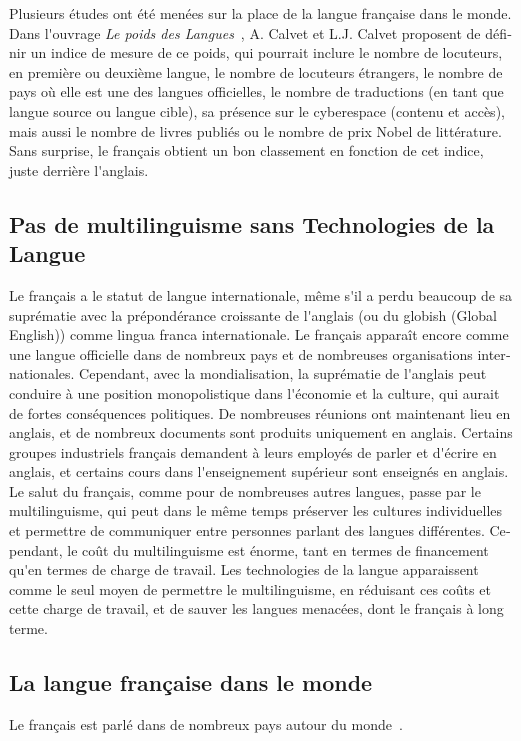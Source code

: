 \documentclass[]{../metanetpaper}
\begin{document}
\begin{french}
\begin{multicols}{2}
Plusieurs études ont été menées sur la place de la langue française
dans le monde. Dans l{\mbox '}ouvrage {\em Le poids des
  Langues}~\cite{calvet09}, A. Calvet et L.J. Calvet proposent de
définir un indice de mesure de ce poids, qui pourrait inclure le
nombre de locuteurs, en première ou deuxième langue, le nombre de
locuteurs étrangers, le nombre de pays où elle est une des langues
officielles, le nombre de traductions (en tant que langue source ou
langue cible), sa présence sur le cyberespace (contenu et accès), mais
aussi le nombre de livres publiés ou le nombre de prix Nobel de
littérature. Sans surprise, le français obtient un bon classement en
fonction de cet indice, juste derrière l{\mbox '}anglais.

\subsection{Pas de multilinguisme sans Technologies de la Langue}

Le français a le statut de langue internationale, même s{\mbox '}il a
perdu beaucoup de sa suprématie avec la prépondérance croissante de
l{\mbox '}anglais (ou du globish (Global English)) comme lingua franca
internationale. Le français apparaît encore comme une langue
officielle dans de nombreux pays et de nombreuses organisations
internationales. Cependant, avec la mondialisation, la suprématie de
l{\mbox '}anglais peut conduire à une position monopolistique dans
l{\mbox '}économie et la culture, qui aurait de fortes conséquences
politiques. De nombreuses réunions ont maintenant lieu en anglais, et
de nombreux documents sont produits uniquement en anglais. Certains
groupes industriels français demandent à leurs employés de parler 
et d{\mbox '}écrire en anglais, et certains cours dans l{\mbox
  '}enseignement supérieur sont enseignés en anglais. Le salut du
français, comme pour de nombreuses autres langues, passe par le
multilinguisme, qui peut dans le même temps préserver les cultures
individuelles et permettre de communiquer entre personnes parlant
des langues différentes. Cependant, le coût du multilinguisme est
énorme, tant en termes de financement qu{\mbox '}en termes de charge
de travail. Les technologies de la langue apparaissent comme le seul
moyen de permettre le multilinguisme, en réduisant ces coûts et cette 
charge de travail, et de sauver les langues menacées, dont le français
à long terme.

\subsection{La langue française dans le monde}
\label{frenchInTheWorld}
Le français est parlé dans de nombreux pays autour du
monde~\cite{francaisautourmonde}.


\end{multicols}
\end{french}
\end{document}
